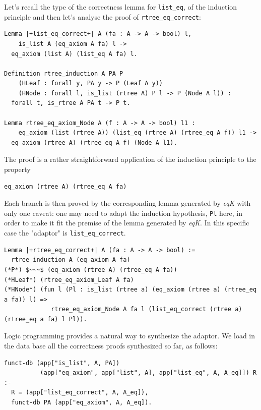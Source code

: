 \documentclass[a4paper,UKenglish,cleveref, autoref]{lipics-v2019}
\newcommand{\derive}[1]{\emph{#1}}
\begin{document}
Let's recall the type of the correctness lemma for
\lstinline+list_eq+, of the induction principle
and then let's analyse the proof of
\lstinline+rtree_eq_correct+:

\begin{lstlisting}
Lemma |+list_eq_correct+| A (fa : A -> A -> bool) l,
    is_list A (eq_axiom A fa) l ->
  eq_axiom (list A) (list_eq A fa) l.

Definition rtree_induction A PA P  
    (HLeaf : forall y, PA y -> P (Leaf A y))
    (HNode : forall l, is_list (rtree A) P l -> P (Node A l)) :
  forall t, is_rtree A PA t -> P t.

Lemma rtree_eq_axiom_Node A (f : A -> A -> bool) l1 :
    eq_axiom (list (rtree A)) (list_eq (rtree A) (rtree_eq A f)) l1 ->
  eq_axiom (rtree A) (rtree_eq A f) (Node A l1).
\end{lstlisting}
       
\noindent
The proof is a rather straightforward application
of the induction principle to the property

\begin{lstlisting}
eq_axiom (rtree A) (rtree_eq A fa)
\end{lstlisting}

\noindent
Each branch is then proved by the corresponding
lemma generated by \derive{eqK} with only one caveat:
one may need to adapt the induction hypothesis, 
\lstinline+Pl+ here, in order to make it fit the premise
of the lemma generated by \derive{eqK}. In this specific
case the "adaptor" is \lstinline+list_eq_correct+.

\begin{lstlisting}
Lemma |+rtree_eq_correct+| A (fa : A -> A -> bool) :=
  rtree_induction A (eq_axiom A fa)
(*P*) $~~~$ (eq_axiom (rtree A) (rtree_eq A fa))
(*HLeaf*) (rtree_eq_axiom_Leaf A fa)
(*HNode*) (fun l (Pl : is_list (rtree a) (eq_axiom (rtree a) (rtree_eq a fa)) l) =>
             rtree_eq_axiom_Node A fa l (list_eq_correct (rtree a) (rtree_eq a fa) l Pl)).
\end{lstlisting}

Logic programming provides a natural way to synthesize
the adaptor.  We load in the data base
all the correctness proofs synthesized so far, as follows:

\begin{lstlisting}[]
funct-db (app["is_list", A, PA])
          (app["eq_axiom", app["list", A], app["list_eq", A, A_eq]]) R :-
  R = (app["list_eq_correct", A, A_eq]),
  funct-db PA (app["eq_axiom", A, A_eq]).
\end{lstlisting}
\end{document}

